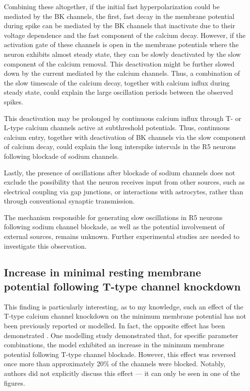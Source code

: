 \documentclass[../main.tex]{subfiles}
\begin{document}
Combining these altogether, if the initial fast hyperpolarization could be mediated by the BK channels, the first, fast decay in the membrane potential during spike can be mediated by the BK channels that inactivate due to their voltage dependence and the fast component of the calcium decay. However, if the activation gate of these channels is open in the membrane potentials where the neuron exhibits almost steady state, they can be slowly deactivated by the slow component of the calcium removal. This deactivation might be further slowed down by the current mediated by the calcium channels. Thus, a combination of the slow timescale of the calcium decay, together with calcium influx during steady state, could explain the large oscillation periods between the observed spikes.

This deactivation may be prolonged by continuous calcium influx through T- or L-type calcium channels active at subthreshold potentials. Thus, continuous calcium entry, together with deactivation of BK channels via the slow component of calcium decay, could explain the long interspike intervals in the R5 neurons following blockade of sodium channels.

Lastly, the presence of oscillations after blockade of sodium channels does not exclude the possibility that the neuron receives input from other sources, such as electrical coupling via gap junctions, or interactions with astrocytes, rather than through conventional synaptic transmission.

The mechanism responsible for generating slow oscillations in R5 neurons following sodium channel blockade, as well as the potential involvement of external sources, remains unknown. Further experimental studies are needed to investigate this observation.


\subsection{Increase in minimal resting membrane potential following T-type channel knockdown}

This finding is particularly interesting, as to my knowledge, such an effect of the T-type calcium channel knockdown on the minimum membrane potential has not been previously reported or modelled. In fact, the opposite effect has been demonstrated \cite{alonsoVisualizationCurrentsNeural2019}. One modelling study demonstrated that, for specific parameter combinations, the model exhibited an increase in the minimum membrane potential following T-type channel blockade. However, this effect was reversed once more than approximately 20\% of the channels were blocked. Notably, authors did not explicitly discuss this effect — it can only be seen in one of the figures.
\end{document}
